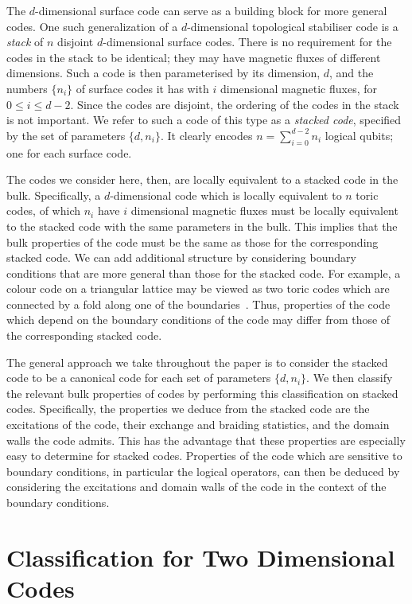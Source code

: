 \documentclass[pra,twocolumn,a4paper,nofootinbib]{revtex4-1}
\begin{document}
The $d$-dimensional surface code can serve as a building block for more general codes.  One such generalization of a $d$-dimensional topological stabiliser code is a \emph{stack} of $n$ disjoint $d$-dimensional surface codes.  There is no requirement for the codes in the stack to be identical; they may have magnetic fluxes of different dimensions. Such a code is then parameterised by its dimension, $d$, and the numbers $\{n_i\}$ of surface codes it has with $i$ dimensional magnetic fluxes, for $0 \leq i \leq d-2$. Since the codes are disjoint, the ordering of the codes in the stack is not important. We refer to such a code of this type as a \emph{stacked code}, specified by the set of parameters $\{d,n_i\}$. It clearly encodes $n=\sum_{i=0}^{d-2} n_i$ logical qubits; one for each surface code.

The codes we consider here, then, are locally equivalent to a stacked code in the bulk. Specifically, a $d$-dimensional code which is locally equivalent to $n$ toric codes, of which $n_i$ have $i$ dimensional magnetic fluxes must be locally equivalent to the stacked code with the same parameters in the bulk. This implies that the bulk properties of the code must be the same as those for the corresponding stacked code. We can add additional structure by considering boundary conditions that are more general than those for the stacked code. For example, a colour code on a triangular lattice may be viewed as two toric codes which are connected by a fold along one of the boundaries~\cite{Kubica}. Thus, properties of the code which depend on the boundary conditions of the code may differ from those of the corresponding stacked code.

The general approach we take throughout the paper is to consider the stacked code to be a canonical code for each set of parameters  $\{d,n_i\}$. We then classify the relevant bulk properties of codes by performing this classification on stacked codes. Specifically, the properties we deduce from the stacked code are the excitations of the code, their exchange and braiding statistics, and the domain walls the code admits. This has the advantage that these properties are especially easy to determine for stacked codes. Properties of the code which are sensitive to boundary conditions, in particular the logical operators, can then be deduced by considering the excitations and domain walls of the code in the context of the boundary conditions.

\section{Classification for Two Dimensional Codes}
\label{III}
\end{document}
